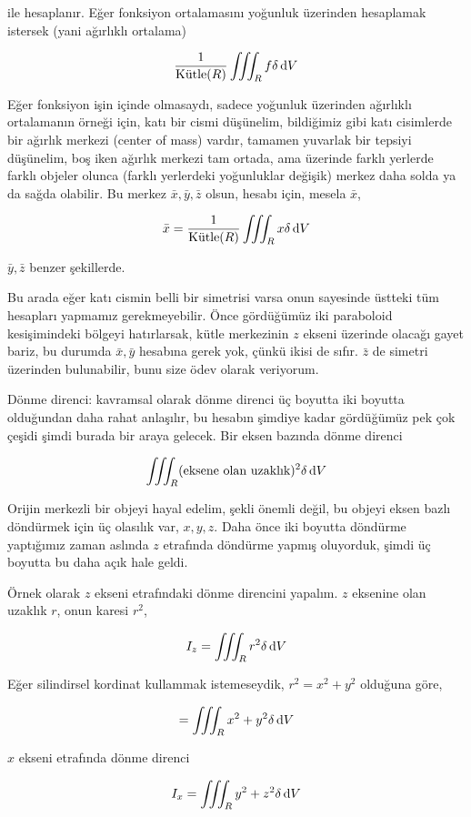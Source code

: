 \documentclass[12pt,fleqn]{article}\usepackage{../../common}
\begin{document}
ile hesaplanır. Eğer fonksiyon ortalamasını yoğunluk üzerinden hesaplamak
istersek (yani ağırlıklı ortalama)

$$ 
\frac{1}{\textrm{Kütle}(R)} \iiint_R f \delta \,\mathrm{d} V
$$

Eğer fonksiyon işin içinde olmasaydı, sadece yoğunluk üzerinden ağırlıklı
ortalamanın örneği için, katı bir cismi düşünelim, bildiğimiz gibi katı
cisimlerde bir ağırlık merkezi (center of mass) vardır, tamamen yuvarlak
bir tepsiyi düşünelim, boş iken ağırlık merkezi tam ortada, ama üzerinde
farklı yerlerde farklı objeler olunca (farklı yerlerdeki yoğunluklar
değişik) merkez daha solda ya da sağda olabilir. Bu merkez
$\bar{x},\bar{y},\bar{z}$ olsun, hesabı için, mesela $\bar{x}$,

$$ 
\bar{x} = \frac{1}{\textrm{Kütle}(R)} \iiint_R x \delta \,\mathrm{d} V
$$

$\bar{y},\bar{z}$ benzer şekillerde.

Bu arada eğer katı cismin belli bir simetrisi varsa onun sayesinde üstteki
tüm hesapları yapmamız gerekmeyebilir. Önce gördüğümüz iki paraboloid
kesişimindeki bölgeyi hatırlarsak, kütle merkezinin $z$ ekseni üzerinde
olacağı gayet bariz, bu durumda $\bar{x},\bar{y}$ hesabına gerek yok, çünkü
ikisi de sıfır. $\bar{z}$ de simetri üzerinden bulunabilir, bunu size ödev
olarak veriyorum. 

Dönme direnci: kavramsal olarak dönme direnci üç boyutta iki boyutta
olduğundan daha rahat anlaşılır, bu hesabın şimdiye kadar gördüğümüz pek
çok çeşidi şimdi burada bir araya gelecek. Bir eksen bazında dönme direnci

$$ 
\iiint_R (\textrm{eksene olan uzaklık})^2 \delta \,\mathrm{d} V
$$

Orijin merkezli bir objeyi hayal edelim, şekli önemli değil, bu objeyi
eksen bazlı döndürmek için üç olasılık var, $x,y,z$. Daha önce iki boyutta
döndürme yaptığımız zaman aslında $z$ etrafında döndürme yapmış oluyorduk,
şimdi üç boyutta bu daha açık hale geldi. 

Örnek olarak $z$ ekseni etrafındaki dönme direncini yapalım. $z$ eksenine
olan uzaklık $r$, onun karesi $r^2$, 

$$ 
I_z = \iiint_R r^2 \delta \,\mathrm{d} V
$$

Eğer silindirsel kordinat kullammak istemeseydik, $r^2 = x^2 + y^2$ olduğuna
göre, 

$$ 
 = \iiint_R x^2 + y^2 \delta \,\mathrm{d} V
$$

$x$ ekseni etrafında dönme direnci

$$ 
I_x = \iiint_R y^2 + z^2 \delta \,\mathrm{d} V
$$
\end{document}

